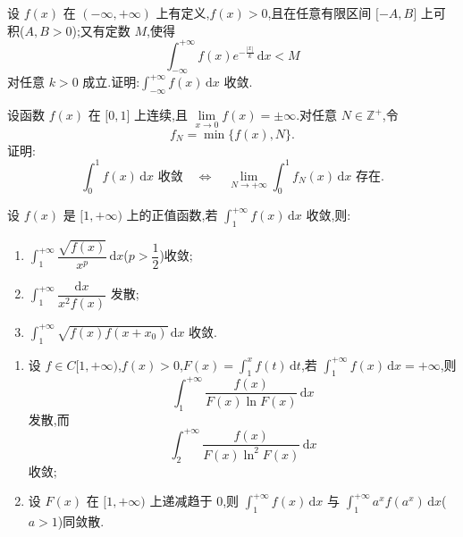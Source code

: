 \documentclass[../数学分析培优讲义.tex]{subfiles}
\begin{document}
\begin{example}
设 $f(x)$ 在 $(-\infty,+\infty)$ 上有定义,$f(x)>0$,且在任意有限区间 $\lbrack -A,B\rbrack$ 上可积($A,B>0$);又有定数 $M$,使得
\[
    \int_{-\infty}^{+\infty}f(x)e^{-\frac{|x|}{k}}\,\mathrm{d}x<M
\]
对任意 $k>0$ 成立.证明:$\displaystyle\int_{-\infty}^{+\infty}f(x)\,\mathrm{d}x$ 收敛.
\end{example}
\exampleblank

\begin{example}
设函数 $f(x)$ 在 $\lbrack 0,1\rbrack$ 上连续,且 $\displaystyle\lim\limits_{x\to0}f(x)=\pm\infty$.对任意 $N\in\mathbb{Z}^+$,令
\[
    f_N=\min\{f(x),N\}.
\]
证明:
\[
    \int_0^1f(x)\,\mathrm{d}x\text{ 收敛}
    \quad\Longleftrightarrow\quad
    \lim\limits_{N\to+\infty}\int_0^1f_N(x)\,\mathrm{d}x\text{ 存在}.
\]
\end{example}
\exampleblank

\begin{example}
设 $f(x)$ 是 $\lbrack 1,+\infty)$ 上的正值函数,若 $\displaystyle\int_1^{+\infty}f(x)\,\mathrm{d}x$ 收敛,则:
\begin{enumerate}[label=(\arabic*)]
    \item $\displaystyle\int_1^{+\infty}\dfrac{\sqrt{f(x)}}{x^p}\,\mathrm{d}x$($p>\dfrac{1}{2}$)收敛;
    \item $\displaystyle\int_1^{+\infty}\dfrac{\mathrm{d}x}{x^2f(x)}$ 发散;
    \item $\displaystyle\int_1^{+\infty}\sqrt{f(x)f(x+x_0)}\,\mathrm{d}x$ 收敛.
\end{enumerate}
\end{example}
\exampleblank

\begin{example}
\begin{enumerate}[label=(\arabic*)]
    \item 设 $f\in C\lbrack 1,+\infty)$,$f(x)>0$,$\displaystyle F(x)=\int_1^xf(t)\,\mathrm{d}t$,若 $\displaystyle\int_1^{+\infty}f(x)\,\mathrm{d}x=+\infty$,则
    \[
        \int_1^{+\infty}\dfrac{f(x)}{F(x)\ln F(x)}\,\mathrm{d}x
    \]
    发散,而
    \[
        \int_2^{+\infty}\dfrac{f(x)}{F(x)\ln^2F(x)}\,\mathrm{d}x
    \]
    收敛;
    \item 设 $F(x)$ 在 $\lbrack 1,+\infty)$ 上递减趋于 $0$,则 $\displaystyle\int_1^{+\infty}f(x)\,\mathrm{d}x$ 与 $\displaystyle\int_1^{+\infty}a^xf(a^x)\,\mathrm{d}x$($a>1$)同敛散.
\end{enumerate}
\end{example}
\exampleblank
\end{document}
